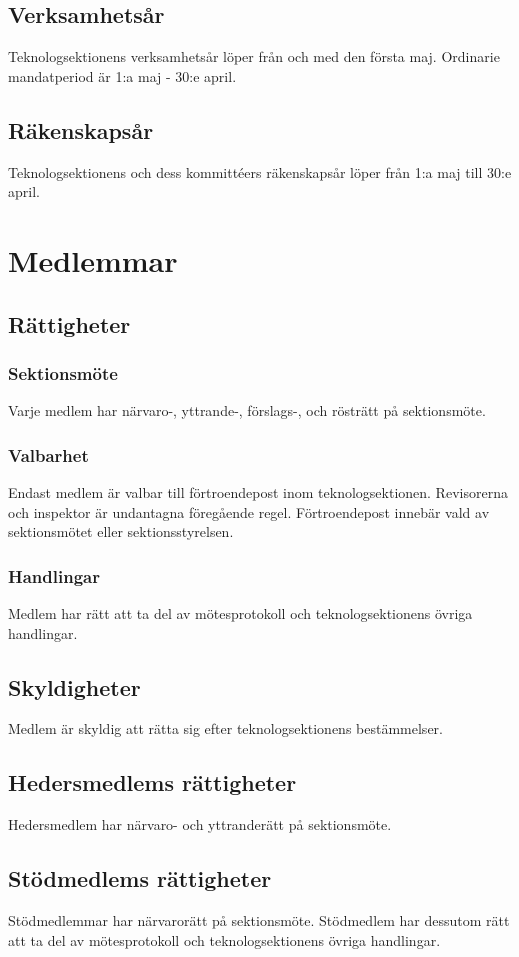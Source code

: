 \documentclass[a4paper]{dtek}
\begin{document}
\subsection{Verksamhetsår}
Teknologsektionens verksamhetsår löper från och med den första maj. Ordinarie mandatperiod är 1:a maj - 30:e april.
\subsection{Räkenskapsår}
Teknologsektionens och dess kommittéers räkenskapsår löper från 1:a maj till 30:e april.
\newpage

\section{Medlemmar}
\subsection{Rättigheter}
\subsubsection{Sektionsmöte}
Varje medlem har närvaro-, yttrande-, förslags-, och rösträtt på sektionsmöte.
\subsubsection{Valbarhet}
\label{sec:medlemmar_valbarhet}
Endast medlem är valbar till förtroendepost inom teknologsektionen. Revisorerna och inspektor är undantagna föregående regel. Förtroendepost innebär vald av sektionsmötet eller sektionsstyrelsen.
\subsubsection{Handlingar}
Medlem har rätt att ta del av mötesprotokoll och teknologsektionens övriga handlingar.
\subsection{Skyldigheter}
Medlem är skyldig att rätta sig efter teknologsektionens bestämmelser.
\subsection{Hedersmedlems rättigheter}
Hedersmedlem har närvaro- och yttranderätt på sektionsmöte.
\subsection{Stödmedlems rättigheter}
Stödmedlemmar har närvarorätt på sektionsmöte. Stödmedlem har dessutom rätt att ta del av mötesprotokoll och teknologsektionens övriga handlingar.
\newpage
\end{document}
